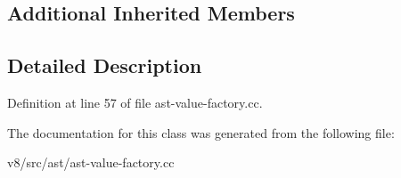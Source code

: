 \subsection*{Additional Inherited Members}


\subsection{Detailed Description}


Definition at line 57 of file ast-\/value-\/factory.\+cc.



The documentation for this class was generated from the following file\+:\begin{DoxyCompactItemize}
\item 
v8/src/ast/ast-\/value-\/factory.\+cc\end{DoxyCompactItemize}
